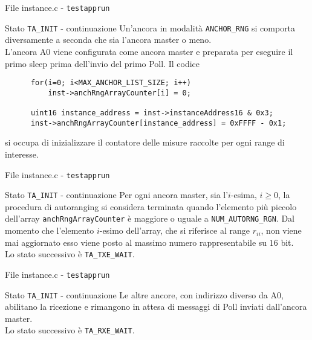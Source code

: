 \begin{frame}[fragile]{File instance.c - \lstinline!testapprun!}
  \begin{block}{Stato \lstinline!TA_INIT! - continuazione}
    Un'ancora in modalità \lstinline!ANCHOR_RNG! si comporta diversamente a seconda che sia l'ancora master o meno.\\
    L'ancora A0 viene configurata come ancora master e preparata per eseguire il primo sleep prima dell'invio del primo Poll.
    Il codice
    \begin{lstlisting}
      for(i=0; i<MAX_ANCHOR_LIST_SIZE; i++)
          inst->anchRngArrayCounter[i] = 0;
      
      uint16 instance_address = inst->instanceAddress16 & 0x3;
      inst->anchRngArrayCounter[instance_address] = 0xFFFF - 0x1;
    \end{lstlisting}
    si occupa di inizializzare il contatore delle misure raccolte per ogni range di interesse.
  \end{block}
\end{frame}


\begin{frame}[fragile]{File instance.c - \lstinline!testapprun!}
  \begin{block}{Stato \lstinline!TA_INIT! - continuazione}
    Per ogni ancora master, sia l'$i$-esima, $i \ge 0$, la procedura di autoranging si considera terminata
    quando l'elemento più piccolo dell'array \lstinline!anchRngArrayCounter! è maggiore o uguale a
    \lstinline!NUM_AUTORNG_RGN!. Dal momento che l'elemento $i$-esimo dell'array, che si riferisce al range
    $r_{ii}$, non viene mai aggiornato esso viene posto al massimo numero rappresentabile su $16$ bit.\\
    \alert{Lo stato successivo} è \lstinline!TA_TXE_WAIT!.
  \end{block}
\end{frame}

\begin{frame}[fragile]{File instance.c - \lstinline!testapprun!}
  \begin{block}{Stato \lstinline!TA_INIT! - continuazione}
    Le altre ancore, con indirizzo diverso da A0, abilitano la ricezione
    e rimangono in attesa di messaggi di Poll inviati dall'ancora master.\\
    \alert{Lo stato successivo} è \lstinline!TA_RXE_WAIT!.
  \end{block}
\end{frame}

